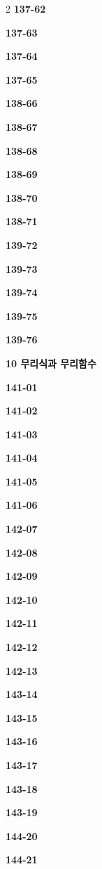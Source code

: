\documentclass[10pt,a4paper]{article}
\begin{document}
\begin{multicols}{2}
\noindent\textbf{137-62}\ \par
\noindent\textbf{137-63}\ \par
\noindent\textbf{137-64}\ \par
\noindent\textbf{137-65}\ \par
\noindent\textbf{138-66}\ \par
\noindent\textbf{138-67}\ \par
\noindent\textbf{138-68}\ \par
\noindent\textbf{138-69}\ \par
\noindent\textbf{138-70}\ \par
\noindent\textbf{138-71}\ \par
\noindent\textbf{139-72}\ \par
\noindent\textbf{139-73}\ \par
\noindent\textbf{139-74}\ \par
\noindent\textbf{139-75}\ \par
\noindent\textbf{139-76}\ \par
\noindent\textbf{10 무리식과 무리함수}\par\smallskip
\noindent\textbf{141-01}\ \par
\noindent\textbf{141-02}\ \par
\noindent\textbf{141-03}\ \par
\noindent\textbf{141-04}\ \par
\noindent\textbf{141-05}\ \par
\noindent\textbf{141-06}\ \par
\noindent\textbf{142-07}\ \par
\noindent\textbf{142-08}\ \par
\noindent\textbf{142-09}\ \par
\noindent\textbf{142-10}\ \par
\noindent\textbf{142-11}\ \par
\noindent\textbf{142-12}\ \par
\noindent\textbf{142-13}\ \par
\noindent\textbf{143-14}\ \par
\noindent\textbf{143-15}\ \par
\noindent\textbf{143-16}\ \par
\noindent\textbf{143-17}\ \par
\noindent\textbf{143-18}\ \par
\noindent\textbf{143-19}\ \par
\noindent\textbf{144-20}\ \par
\noindent\textbf{144-21}\ \par

\end{multicols}
\end{document}
